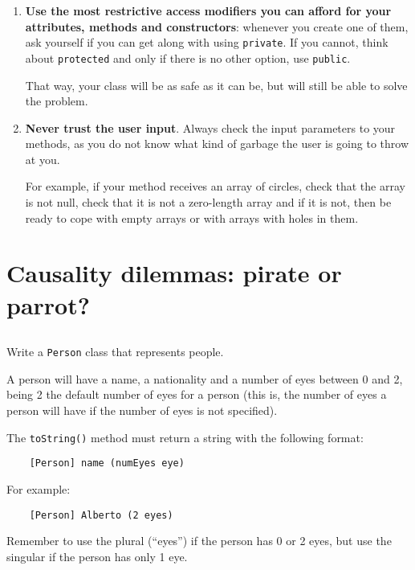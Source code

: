 \documentclass[a4paper, 11pt]{article}
\begin{document}
\begin{enumerate}
  \item \textbf{Use the most restrictive access modifiers you can afford for
    your attributes, methods and constructors}: whenever you create one of
    them, ask yourself if you can get along with using \verb+private+. If you
    cannot, think about \verb+protected+ and only if there is no other option,
    use \verb+public+.

    That way, your class will be as safe as it can be, but will still be able
    to solve the problem.

  \item \textbf{Never trust the user input}. Always check the input parameters
    to your methods, as you do not know what kind of garbage the user is going
    to throw at you.

    For example, if your method receives an array of circles, check that the
    array is not null, check that it is not a zero-length array and if it is
    not, then be ready to cope with empty arrays or with arrays with holes in
    them.

\end{enumerate}









\section{Causality dilemmas: pirate or parrot?}

\subsection{}

Write a \verb+Person+ class that represents people.

A person will have a name, a nationality and a number of eyes between 0 and 2,
being 2 the default number of eyes for a person (this is, the number of eyes a
person will have if the number of eyes is not specified).

The \verb+toString()+ method must return a string with the following
format:

\verb+    [Person] name (numEyes eye)+

For example:

\verb+    [Person] Alberto (2 eyes)+

Remember to use the plural (``eyes'') if the person has 0 or 2 eyes, but use
the singular if the person has only 1 eye.
\end{document}
